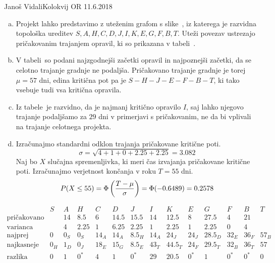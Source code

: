 \begin{naloga}{Janoš Vidali}{Kolokvij OR 11.6.2018}
\begin{odgovor}
\begin{enumerate}[(a)]
\item Projekt lahko predstavimo z uteženim grafom s slike~\fig,
iz katerega je razvidna topološka ureditev $S, A, H, C, D, J, I, K, E, G, F, B, T$.
Uteži povezav ustrezajo pričakovanim trajanjem opravil,
ki so prikazana v tabeli~.

\item V tabeli~
so podani najzgodnejši začetki opravil in najpoznejši začetki,
da se celotno trajanje gradnje ne podaljša.
Pričakovano trajanje gradnje je torej $\mu = 57$ dni,
edina kritična pot pa je $S - H - J - E - F - B - T$,
ki tako vsebuje tudi vsa kritična opravila.

\item Iz tabele~ je razvidno,
da je najmanj kritično opravilo $I$,
saj lahko njegovo trajanje
podaljšamo za $29$ dni v primerjavi s pričakovanim,
ne da bi vplivali na trajanje celotnega projekta.

\item Izračunajmo standardni odklon trajanja pričakovane kritične poti.
$$
\sigma = \sqrt{4 + 1 + 0 + 2.25 + 2.25} = 3.082
$$
Naj bo $X$ slučajna spremenljivka,
ki meri čas izvajanja pričakovane kritične poti.
Izračunajmo verjetnost končanja v roku $T = 55$ dni.
$$
P(X \le 55) = \Phi\left({T - \mu \over \sigma}\right) = \Phi(-0.6489) = 0.2578
$$
\end{enumerate}
%
\begin{slika}
\makebox[\textwidth][c]{
\pgfslika
}
\end{slika}
%
\begin{tabela}
$$
\begin{array}{c|ccccccccccccc}
& S & A & H & C & D & J & I & K & E & G & F & B & T \\ \hline
\text{pričakovano} && 14 & 8.5 & 6 & 14.5 & 15.5 & 14 & 12.5 & 8 & 27.5 & 4 & 21 \\
\text{varianca} && 4 & 2.25 & 1 & 6.25 & 2.25 & 1 & 2.25 & 1 & 2.25 & 0 & 4  \\
\hline
\text{najprej} & 0 & 0_S & 0_S & 14_A & 14_A & 8.5_H & 14_A & 24_J & 24_J & 28.5_D & 32_E & 36_F & 57_B \\
\text{najkasneje} & 0_H & 1_D & 0_J & 18_E & 15_G & 8.5_E & 43_T & 44.5_T & 24_F & 29.5_T & 32_B & 36_T & 57 \\
\text{razlika} & 0 & 1 & 0^* & 4 & 1 & 0^* & 29 & 20.5 & 0^* & 1 & 0^* & 0^* & 0 \\
\end{array}
$$
\end{tabela}

\end{odgovor}
\end{naloga}
